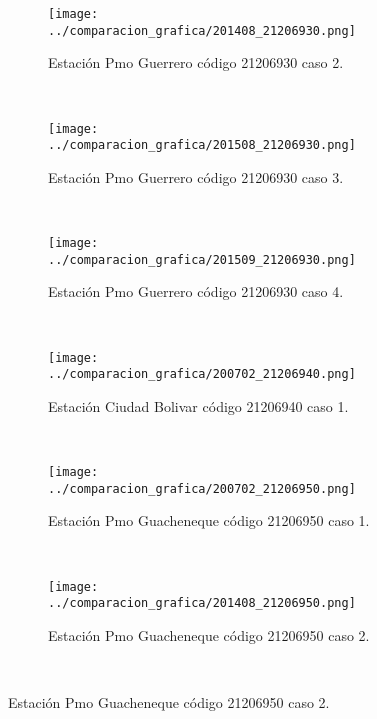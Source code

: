 \begin{figure}[H]\ContinuedFloat
\centering
\begin{subfigure}[normla]{0.4\textwidth}
\caption{Estación Pmo Guerrero código 21206930 caso 2.}
\texttt{[image: ../comparacion\_grafica/201408\_21206930.png]}
\end{subfigure}
~
\begin{subfigure}[normla]{0.4\textwidth}
\caption{Estación Pmo Guerrero código 21206930 caso 3.}
\texttt{[image: ../comparacion\_grafica/201508\_21206930.png]}
\end{subfigure}
~
\begin{subfigure}[normla]{0.4\textwidth}
\caption{Estación Pmo Guerrero código 21206930 caso 4.}
\texttt{[image: ../comparacion\_grafica/201509\_21206930.png]}
\end{subfigure}
~
\begin{subfigure}[normla]{0.4\textwidth}
\caption{Estación Ciudad Bolivar código 21206940 caso 1.}
\texttt{[image: ../comparacion\_grafica/200702\_21206940.png]}
\end{subfigure}
~
\begin{subfigure}[normla]{0.4\textwidth}
\caption{Estación Pmo Guacheneque código 21206950 caso 1.}
\texttt{[image: ../comparacion\_grafica/200702\_21206950.png]}
\end{subfigure}
~
\begin{subfigure}[normla]{0.4\textwidth}
\caption{Estación Pmo Guacheneque código 21206950 caso 2.}
\texttt{[image: ../comparacion\_grafica/201408\_21206950.png]}
\end{subfigure}
~
\end{figure}
           
